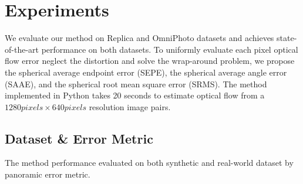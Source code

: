 \section{Experiments}
\label{sec:exp}

We evaluate our method on Replica\cite{StrauWMCWGEMRVCYBYPYZLCBGMPSBSNGLN2019} and OmniPhoto\cite{BerteYLR2020} datasets and achieves state-of-the-art performance on both datasets.
%
To uniformly evaluate each pixel optical flow error neglect the distortion and solve the wrap-around problem, we propose the spherical average endpoint error (SEPE), the spherical average angle error (SAAE), and the spherical root mean square error  (SRMS).
%
The method implemented in Python takes 20 seconds to estimate optical flow from a $1280 pixels\times640 pixels$ resolution image pairs.

\subsection{Dataset \& Error Metric}

The method performance evaluated on both synthetic and real-world dataset by panoramic error metric.


